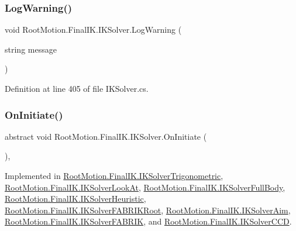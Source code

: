 \subsubsection{\texorpdfstring{Log\+Warning()}{LogWarning()}}
{\footnotesize\ttfamily void Root\+Motion.\+Final\+I\+K.\+I\+K\+Solver.\+Log\+Warning (\begin{DoxyParamCaption}\item[{string}]{message }\end{DoxyParamCaption})\hspace{0.3cm}{\ttfamily [protected]}}



Definition at line 405 of file I\+K\+Solver.\+cs.

\mbox{\label{class_root_motion_1_1_final_i_k_1_1_i_k_solver_a2a8cbf1dfed274fdbc79ff011c468cc6}} 
\subsubsection{\texorpdfstring{On\+Initiate()}{OnInitiate()}}
{\footnotesize\ttfamily abstract void Root\+Motion.\+Final\+I\+K.\+I\+K\+Solver.\+On\+Initiate (\begin{DoxyParamCaption}{ }\end{DoxyParamCaption})\hspace{0.3cm}{\ttfamily [protected]}, {}}



Implemented in \mbox{\hyperlink{class_root_motion_1_1_final_i_k_1_1_i_k_solver_trigonometric_a57ee7178a992a1a4e32387f19af6227f}{Root\+Motion.\+Final\+I\+K.\+I\+K\+Solver\+Trigonometric}}, \mbox{\hyperlink{class_root_motion_1_1_final_i_k_1_1_i_k_solver_look_at_a903b4b46d1636ca48916c268d91a50d3}{Root\+Motion.\+Final\+I\+K.\+I\+K\+Solver\+Look\+At}}, \mbox{\hyperlink{class_root_motion_1_1_final_i_k_1_1_i_k_solver_full_body_a314815fbee3caadfd26d449764ee6e5c}{Root\+Motion.\+Final\+I\+K.\+I\+K\+Solver\+Full\+Body}}, \mbox{\hyperlink{class_root_motion_1_1_final_i_k_1_1_i_k_solver_heuristic_a665700645200f3960f186bb6d3835691}{Root\+Motion.\+Final\+I\+K.\+I\+K\+Solver\+Heuristic}}, \mbox{\hyperlink{class_root_motion_1_1_final_i_k_1_1_i_k_solver_f_a_b_r_i_k_root_aff0059cd604e4b24bece3d9f6ba93837}{Root\+Motion.\+Final\+I\+K.\+I\+K\+Solver\+F\+A\+B\+R\+I\+K\+Root}}, \mbox{\hyperlink{class_root_motion_1_1_final_i_k_1_1_i_k_solver_aim_ab758f8eb82d72511af5619e483d35f72}{Root\+Motion.\+Final\+I\+K.\+I\+K\+Solver\+Aim}}, \mbox{\hyperlink{class_root_motion_1_1_final_i_k_1_1_i_k_solver_f_a_b_r_i_k_a1d4c5d7ee7db732fca38ca620fecd072}{Root\+Motion.\+Final\+I\+K.\+I\+K\+Solver\+F\+A\+B\+R\+IK}}, and \mbox{\hyperlink{class_root_motion_1_1_final_i_k_1_1_i_k_solver_c_c_d_ac5297e593852814356258fe9f51a2774}{Root\+Motion.\+Final\+I\+K.\+I\+K\+Solver\+C\+CD}}.


